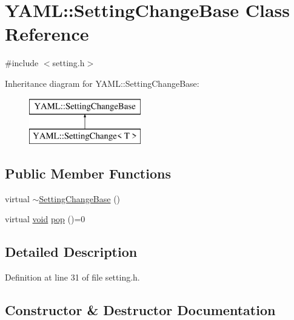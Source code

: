 \hypertarget{class_y_a_m_l_1_1_setting_change_base}{}\section{Y\+A\+ML\+::Setting\+Change\+Base Class Reference}
\label{class_y_a_m_l_1_1_setting_change_base}


{\ttfamily \#include $<$setting.\+h$>$}

Inheritance diagram for Y\+A\+ML\+::Setting\+Change\+Base\+:\begin{figure}[H]
\begin{center}
\leavevmode
\includegraphics[height=2.000000cm]{class_y_a_m_l_1_1_setting_change_base}
\end{center}
\end{figure}
\subsection*{Public Member Functions}
\begin{DoxyCompactItemize}
\item 
virtual \mbox{\hyperlink{class_y_a_m_l_1_1_setting_change_base_ac3f41696739391318ed23500c489807a}{$\sim$\+Setting\+Change\+Base}} ()
\item 
virtual \mbox{\hyperlink{glad_8h_a950fc91edb4504f62f1c577bf4727c29}{void}} \mbox{\hyperlink{class_y_a_m_l_1_1_setting_change_base_a189c55070d4636271b3504aacd097e8c}{pop}} ()=0
\end{DoxyCompactItemize}


\subsection{Detailed Description}


Definition at line 31 of file setting.\+h.



\subsection{Constructor \& Destructor Documentation}
\mbox{\label{class_y_a_m_l_1_1_setting_change_base_ac3f41696739391318ed23500c489807a}} 
